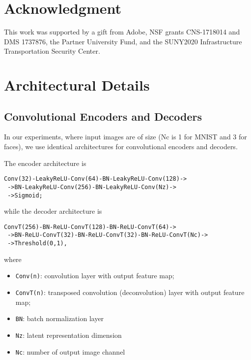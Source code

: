 \documentclass[runningheads]{llncs}
\begin{document}
\section{Acknowledgment}

This work was supported by a gift from Adobe, NSF grants CNS-1718014 and DMS 1737876, the Partner University Fund, and the SUNY2020 Infrastructure Transportation Security Center.




\clearpage




\appendix
\section{Architectural Details}
\label{append:architecture}
\subsection{Convolutional Encoders and Decoders}
\label{sec:convnet}
In our experiments, where input images are of size  (Nc is 1 for MNIST and 3 for faces), we use identical architectures for convolutional encoders and decoders.

The encoder architecture is
\begin{verbatim}
Conv(32)-LeakyReLU-Conv(64)-BN-LeakyReLU-Conv(128)->
 ->BN-LeakyReLU-Conv(256)-BN-LeakyReLU-Conv(Nz)->
 ->Sigmoid;
\end{verbatim}
while the decoder architecture is
\begin{verbatim}
ConvT(256)-BN-ReLU-ConvT(128)-BN-ReLU-ConvT(64)->
 ->BN-ReLU-ConvT(32)-BN-ReLU-ConvT(32)-BN-ReLU-ConvT(Nc)->
 ->Threshold(0,1),
\end{verbatim}

where
\begin{itemize}
	\item \texttt{Conv(n)}: convolution layer with  output feature map;
	\item \texttt{ConvT(n)}: transposed convolution (deconvolution) layer with  output feature map;
	\item \texttt{BN}: batch normalization layer
	\item \texttt{Nz}: latent representation dimension
	\item \texttt{Nc}: number of output image channel
\end{itemize}
\end{document}
